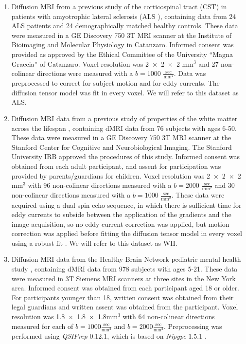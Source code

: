 \documentclass[10pt,%
               aps,%
               prl,%
               preprint,%
               superscriptaddress,%
               preprintnumbers,%
               amsmath,%
               floatfix,%
               endfloats*]{revtex4-2}
\begin{document}
\begin{enumerate}

\item Diffusion MRI from a previous study of the corticospinal
tract (CST) in patients with amyotrophic lateral sclerosis
(ALS \cite{sarica2017corticospinal}), containing data from 24 ALS
patients and 24 demographically matched healthy controls. These data
were measured in a GE Discovery 750 3T MRI scanner at the Institute
of Bioimaging and Molecular Physiology in Catanzaro. Informed consent
was provided as approved by the Ethical Committee of the University
``Magna Graecia'' of Catanzaro. Voxel resolution was \num{2x2x2}
$\text{mm}^3$ and 27 non-colinear directions were measured with a
$b=1000$ $\frac{\text{sec}}{\text{mm}^2}$. Data was preprocessed to
correct for subject motion and for eddy currents. The diffusion tensor
model \cite{basser1994mr} was fit in every voxel.
We will refer to this dataset as ALS.

\item Diffusion MRI data from a previous study of properties of
the white matter across the lifespan \cite{yeatman2014lifespan},
containing dMRI data from 76 subjects with ages 6-50. These data were
measured in a GE Discovery 750 3T MRI scanner at the Stanford Center
for Cognitive and Neurobiological Imaging. The Stanford University
IRB approved the procedures of this study. Informed consent was
obtained from each adult participant, and assent for participation
was provided by parents/guardians for children. Voxel resolution was
\num{2x2x2}$\text{mm}^3$ with 96 non-colinear directions measured with a
$b=2000$ $\frac{\text{sec}}{\text{mm}^2}$ and 30 non-colinear directions
measured with a $b=1000$ $\frac{\text{sec}}{\text{mm}^2}$. These data
were acquired using a dual spin echo sequence, in which there is
sufficient time for eddy currents to subside between the application of
the gradients and the image acquisition, so no eddy current correction
was applied, but motion correction was applied before fitting the
diffusion tensor model \cite{basser1994mr} in every voxel using a robust
fit \cite{chang2005restore}. We will refer to this dataset as WH.

\item Diffusion MRI data from the Healthy Brain Network pediatric mental
health study \cite{alexander2017open}, containing dMRI data from 978 subjects
with ages 5-21. These data were measured in 3T Siemens MRI scanners at three
sites in the New York area. Informed consent was obtained from each
participant aged 18 or older. For participants younger than 18, written
consent was obtained from their legal guardians and written assent was
obtained from the participant. Voxel resolution was
\num{1.8x1.8x1.8}$\text{mm}^3$ with 64 non-colinear directions measured for
each of $b=1000 \frac{\text{sec}}{\text{mm}^2}$ and $b=2000
\frac{\text{sec}}{\text{mm}^2}$.
Preprocessing was performed using \emph{QSIPrep} 0.12.1, which is based on
\emph{Nipype} 1.5.1 \cite[RRID:SCR\_002502]{nipype1,nipype2}.


\end{enumerate}
\end{document}
